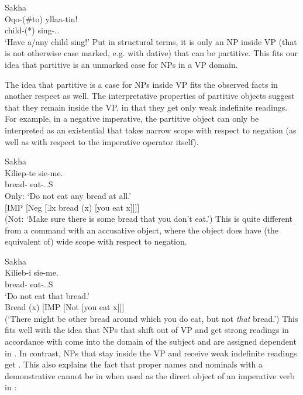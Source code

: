\documentclass[output=paper]{langsci/langscibook}
\begin{document}
\ea\label{ex:12.5}Sakha\\
	\gll    Oqo-(\#to)  yllaa-tin!\\
		    child-(*\Part{})  sing-\Imp{}.\Tsg.\Sbj{}\\
	\glt    ‘Have a/any child sing!’
\z
Put in structural terms, it is only an NP inside VP (that is not otherwise case
marked, e.g. with dative) that can be partitive. This fits our idea that
partitive is an unmarked case for NPs in a VP domain.

The idea that partitive is a case for NPs inside VP fits the observed facts in
another respect as well. The interpretative properties of partitive objects
suggest that they remain inside the VP, in that they get only weak indefinite
readings.  For example, in a negative imperative, the partitive object can only
be interpreted as an existential that takes narrow scope with respect to
negation (as well as with respect to the imperative operator itself).

\ea\label{ex:12.6}Sakha\\
	\gll Kiliep-te  sie-me.\\
		bread-\Part{} eat-\Imp{}.\Neg{}.\Ssg{}S\\
	\glt Only: ‘Do not eat any bread at all.’\\
		 {}[IMP [Neg [${\exists}$x bread (x) [you eat x]]]]\\
		(Not: ‘Make sure there is some bread that you don’t eat.’)
\z
This is quite different from a command with an accusative object, where the
object does have (the equivalent of) wide scope with respect to negation.

\ea\label{ex:12.7}Sakha\\
	\gll Kilieb-i  sie-me.\\
		bread-\Acc{}  eat-\Imp{}.\Neg{}.\Ssg{}S\\
	\glt ‘Do not eat that bread.’\\
		Bread (x) [IMP [Not [you eat x]]]\\
		(‘There might be other bread around which you do eat, but not \textit{that} bread.’)
\z
This fits well with the idea that NPs that shift out of VP and get strong
readings in accordance with   come into
the domain of the subject and are assigned dependent  in .
In contrast, NPs that stay inside the VP and receive weak indefinite readings
get .  This also explains the fact that proper names and nominals
with a demonstrative cannot be in  when used as the direct object
of an imperative verb in :
\end{document}
